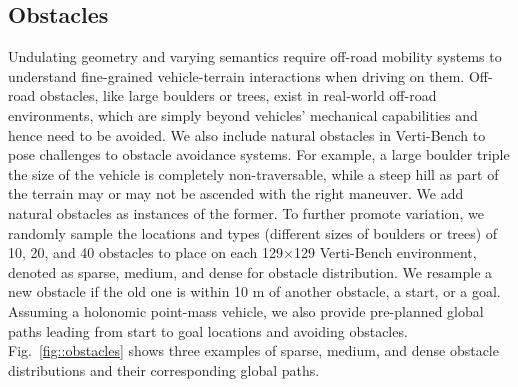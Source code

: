 



\subsection{Obstacles}
Undulating geometry and varying semantics require off-road mobility systems to understand fine-grained vehicle-terrain interactions when driving on them. Off-road obstacles, like large boulders or trees, exist in real-world off-road environments, which are simply beyond vehicles' mechanical capabilities and hence need to be avoided. We also include natural obstacles in Verti-Bench to pose challenges to obstacle avoidance systems. For example, a large boulder triple the size of the vehicle is completely non-traversable, while a steep hill as part of the terrain may or may not be ascended with the right maneuver. We add natural obstacles as instances of the former. To further promote variation, we randomly sample the locations and types (different sizes of boulders or trees) of 10, 20, and 40 obstacles to place on each 129$\times$129 Verti-Bench environment, denoted as sparse, medium, and dense for obstacle distribution. We resample a new obstacle if the old one is within 10 m of another obstacle, a start, or a goal. Assuming a holonomic point-mass vehicle, we also provide pre-planned global paths leading from start to goal locations and avoiding obstacles. Fig.~\ref{fig::obstacles} shows three examples of sparse, medium, and dense obstacle distributions and their corresponding global paths. 

